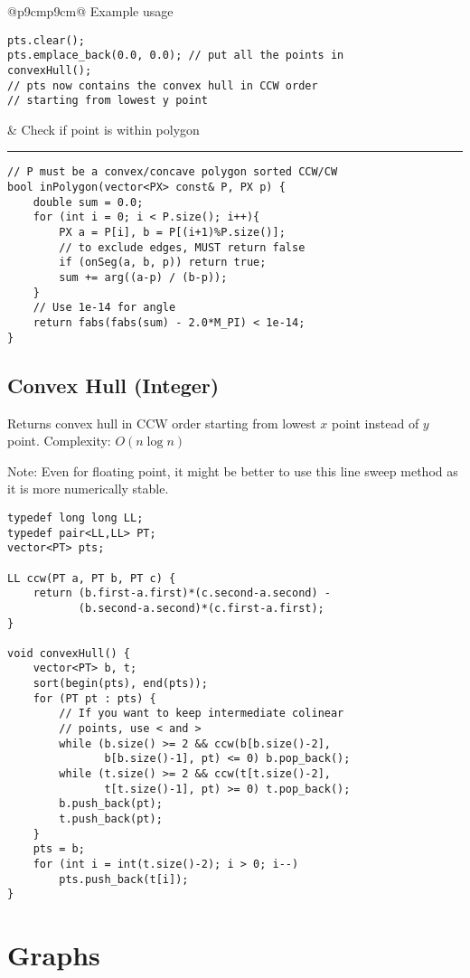 \documentclass[letterpaper]{article}
\newcommand{\rx}[1]{#1\hrule}
\begin{document}
\begin{tabular}{@{}p{9cm}p{9cm}@{}}
Example usage
\begin{lstlisting}
pts.clear();
pts.emplace_back(0.0, 0.0); // put all the points in
convexHull();
// pts now contains the convex hull in CCW order
// starting from lowest y point
\end{lstlisting}
&
\rx{Check if point is within polygon}
\begin{lstlisting}
// P must be a convex/concave polygon sorted CCW/CW
bool inPolygon(vector<PX> const& P, PX p) {
	double sum = 0.0;
	for (int i = 0; i < P.size(); i++){
		PX a = P[i], b = P[(i+1)%P.size()];
		// to exclude edges, MUST return false
		if (onSeg(a, b, p)) return true;
		sum += arg((a-p) / (b-p));
	}
	// Use 1e-14 for angle
	return fabs(fabs(sum) - 2.0*M_PI) < 1e-14;
}
\end{lstlisting}

\subsection{Convex Hull (Integer)}

Returns convex hull in CCW order starting from lowest $x$ point instead of $y$ point. Complexity: $O\left(n\log n\right)$

Note: Even for floating point, it might be better to use this line sweep method as it is more numerically stable.

\begin{lstlisting}
typedef long long LL;
typedef pair<LL,LL> PT;
vector<PT> pts;

LL ccw(PT a, PT b, PT c) {
	return (b.first-a.first)*(c.second-a.second) -
	       (b.second-a.second)*(c.first-a.first);
}

void convexHull() {
	vector<PT> b, t;
	sort(begin(pts), end(pts));
	for (PT pt : pts) {
		// If you want to keep intermediate colinear
		// points, use < and >
		while (b.size() >= 2 && ccw(b[b.size()-2],
		       b[b.size()-1], pt) <= 0) b.pop_back();
		while (t.size() >= 2 && ccw(t[t.size()-2],
		       t[t.size()-1], pt) >= 0) t.pop_back();
		b.push_back(pt);
		t.push_back(pt);
	}
	pts = b;
	for (int i = int(t.size()-2); i > 0; i--)
		pts.push_back(t[i]);
}
\end{lstlisting}
\end{tabular}

\clearpage

\section{Graphs}
\end{document}
